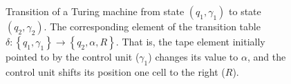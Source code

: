 \begin{figure}
\centering



\caption{Transition of a Turing machine from state $(q_1, \gamma_1)$ to
  state $(q_2, \gamma_2)$. The corresponding element of the transition table
  $\delta: \left\{q_1, \gamma_1\right\} \rightarrow
  \left\{q_2, \alpha, R\right\}$. That is, the tape element initially pointed to
  by the control unit ($\gamma_1$) changes its value to $\alpha$, and the control unit shifts its
  position one cell to the right ($R$).} 
\label{figAddAlgoTuringTrans}
\end{figure}